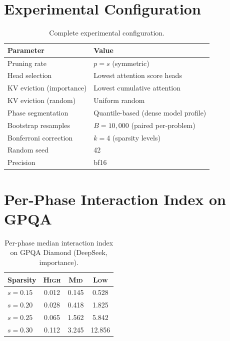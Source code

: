 \documentclass[11pt,a4paper]{article}
\begin{document}
\appendix
\section{Experimental Configuration}
\label{app:config}

\begin{table}[h]
\centering
\small
\caption{Complete experimental configuration.}
\begin{tabular}{@{}ll@{}}
\toprule
Parameter & Value \\
\midrule
Pruning rate & $p = s$ (symmetric) \\
Head selection & Lowest attention score heads \\
KV eviction (importance) & Lowest cumulative attention \\
KV eviction (random) & Uniform random \\
Phase segmentation & Quantile-based (dense model profile) \\
Bootstrap resamples & $B = 10{,}000$ (paired per-problem) \\
Bonferroni correction & $k = 4$ (sparsity levels) \\
Random seed & 42 \\
Precision & bf16 \\
\bottomrule
\end{tabular}
\end{table}

\section{Per-Phase Interaction Index on GPQA}
\label{app:gpqa_phases}

\begin{table}[h]
\centering
\small
\caption{Per-phase median interaction index on GPQA Diamond (DeepSeek, importance).}
\begin{tabular}{@{}lccc@{}}
\toprule
Sparsity & \textsc{High} & \textsc{Mid} & \textsc{Low} \\
\midrule
$s = 0.15$ & 0.012 & 0.145 & 0.528 \\
$s = 0.20$ & 0.028 & 0.418 & 1.825 \\
$s = 0.25$ & 0.065 & 1.562 & 5.842 \\
$s = 0.30$ & 0.112 & 3.245 & 12.856 \\
\bottomrule
\end{tabular}
\end{table}
\end{document}
